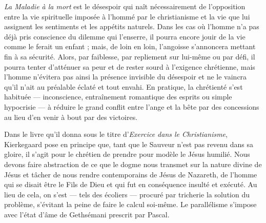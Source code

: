 \documentclass[12pt,a4paper]{article}
\newcommand{\opage}[1]{\marginnote{\footnotesize\textit{[#1]}}}
\begin{document}
\emph{La Maladie à la mort} est le désespoir qui naît nécessairement
de l'opposition entre la vie spirituelle imposée à l'hommé par le
christianisme et la vie que lui assignent les sentiments et les appétits
naturels. Dans les cas où l'homme n'a pas déjà pris conscience du
dilemme qui l'enserre, il pourra encore jouir de la vie comme le ferait
un enfant ; mais, de loin en loin, l'angoisse s'annoncera mettant fin à
\opage{240} sa sécurité. Alors, par faiblesse, par repliement sur lui-même ou
par défi, il pourra tenter d'atténuer sa peur et de rester sourd à
l'exigence chrétienne, mais l'homme n'évitera pas ainsi la présence
invisible du désespoir et ne le vaincra qu'il n'ait au préalable éclaté
et tout envahi. En pratique, la chrétienté s'est habituée --- inconscience,
entraînement romantique des esprits ou simple hypocrisie ---
à réduire le grand conflit entre l'ange et la bête par des concessions
au lieu d'en venir à bout par des victoires.

Dans le livre qu'il donna sous le titre d'\emph{Exercice dans le Christianisme},
Kierkegaard pose en principe que, tant que le Sauveur
n'est pas revenu dans sa gloire, il s'agit pour le chrétien de prendre
pour modèle le Jésus humilié. Nous devons faire abstraction de ce
que le dogme nous transmet sur la nature divine de Jésus et tâcher
de nous rendre contemporains de Jésus de Nazareth, de l'homme
qui se disait être le Fils de Dieu et qui fut en conséquence insulté et
exécuté. Au lieu de cela, on s'est --- tels des écoliers --- procuré par
tricherie la solution du problème, s'évitant la peine de faire le calcul
soi-même. Le parallélisme s'impose avec l'état d'âme de Gethsémani
prescrit par Pascal.
\end{document}
